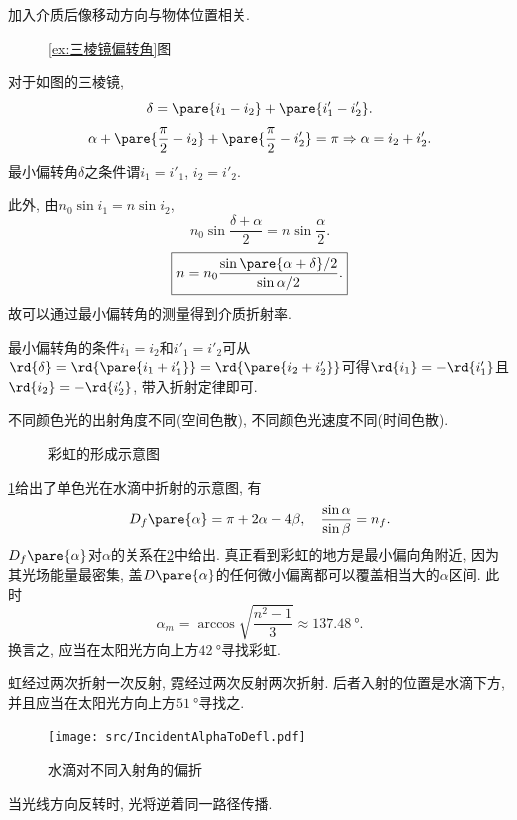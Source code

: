 \documentclass{ctexart}
\begin{document}
\begin{pitfall}
    加入介质后像移动方向与物体位置相关.
\end{pitfall}
\begin{figure}[ht]
    \centering
    \caption{\cref{ex:三棱镜偏转角}图}
\end{figure}
\begin{sample}
    \begin{ex}
        \label{ex:三棱镜偏转角}
        对于如图的三棱镜,
        \[ \delta = \pare{i_1-i_2} + \pare{i'_1 - i'_2}. \]
        \[ \alpha + \pare{\frac{\pi}{2} - i_2} + \pare{\frac{\pi}{2} - i'_2} = \pi \Rightarrow \alpha = i_2 + i'_2. \]
        最小偏转角$\delta$之条件谓$i_1 = i'_1$, $i_2 = i'_2$.
        \par
        此外, 由$n_0\sin i_1 = n\sin i_2$,
        \[ n_0 \sin \frac{\delta + \alpha}{2} = n\sin \frac{\alpha}{2}. \]
        \[ \boxed{n = n_0 \frac{\sin \pare{\alpha+\delta}/2}{\sin \alpha/2}.} \]
        故可以通过最小偏转角的测量得到介质折射率.
    \end{ex}
\end{sample}
\begin{remark}
    最小偏转角的条件$i_1 = i_2$和$i'_1=i'_2$可从$\rd{\delta} = \rd{\pare{i_1+i'_1}} = \rd{\pare{i_2+i'_2}}$可得$\rd{i_1} = -\rd{i'_1}$且$\rd{i_2} = -\rd{i'_2}$, 带入折射定律即可.
\end{remark}
\begin{remark}
    不同颜色光的出射角度不同(空间色散), 不同颜色光速度不同(时间色散).
\end{remark}
\begin{figure}[ht]
    \centering
    \caption{彩虹的形成示意图}
    \label{fig:单色水滴折射}
\end{figure}
\begin{sample}
    \begin{ex}[彩虹的原理]
        \cref{fig:单色水滴折射}给出了单色光在水滴中折射的示意图, 有
        \[ D_f\pare{\alpha} = \pi + 2\alpha - 4\beta, \quad \frac{\sin \alpha}{\sin \beta} = n_f. \]
        $D_f\pare{\alpha}$对$\alpha$的关系在\cref{fig:水滴对不同入射角的偏折}中给出. 真正看到彩虹的地方是最小偏向角附近, 因为其光场能量最密集, 盖$D\pare{\alpha}$的任何微小偏离都可以覆盖相当大的$\alpha$区间. 此时
        \[ \alpha_m = \arccos\sqrt{\frac{n^2-1}{3}} \approx \SI{137.48}{\degree}. \]
        换言之, 应当在太阳光方向上方$\SI{42}{\degree}$寻找彩虹.
        \par
        虹经过两次折射一次反射, 霓经过两次反射两次折射. 后者入射的位置是水滴下方, 并且应当在太阳光方向上方$\SI{51}{\degree}$寻找之.
    \end{ex}
\end{sample}
\begin{figure}[htbp]
    \centering
    \texttt{[image: src/IncidentAlphaToDefl.pdf]}
    \caption{水滴对不同入射角的偏折}
    \label{fig:水滴对不同入射角的偏折}
\end{figure}
\begin{theorem}[光路可逆]
    当光线方向反转时, 光将逆着同一路径传播.
\end{theorem}
\end{document}

